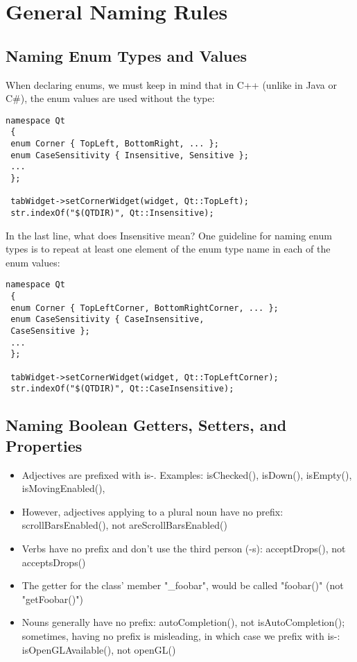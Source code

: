 \documentclass[a4paper,12pt]{article}
\begin{document}
\clearpage
\newpage

\section{General Naming Rules}\label{sec:naming_rules}
\subsection{Naming Enum Types and Values}
When declaring enums, we must keep in mind that in C++ (unlike in Java or C\#), the enum values are used without the type:
\begin{lstlisting}[breaklines]
 namespace Qt
 {
 enum Corner { TopLeft, BottomRight, ... };
 enum CaseSensitivity { Insensitive, Sensitive };
 ...
 };
 
 tabWidget->setCornerWidget(widget, Qt::TopLeft);
 str.indexOf("$(QTDIR)", Qt::Insensitive);
 \end{lstlisting}

In the last line, what does Insensitive mean? One guideline for naming enum types is to repeat at least one element of the enum type name in each of the enum values:
\begin{lstlisting}[breaklines]
 namespace Qt
 {
 enum Corner { TopLeftCorner, BottomRightCorner, ... };
 enum CaseSensitivity { CaseInsensitive,
 CaseSensitive };
 ...
 };
 
 tabWidget->setCornerWidget(widget, Qt::TopLeftCorner);
 str.indexOf("$(QTDIR)", Qt::CaseInsensitive);
 \end{lstlisting}

\subsection{Naming Boolean Getters, Setters, and Properties}
\begin{itemize}
\item Adjectives are prefixed with is-. Examples: isChecked(), isDown(), isEmpty(), isMovingEnabled(), 
\item However, adjectives applying to a plural noun have no prefix: scrollBarsEnabled(), not areScrollBarsEnabled()
\item Verbs have no prefix and don't use the third person (-s): acceptDrops(), not acceptsDrops()
\item The getter for the class' member "\_foobar", would be called "foobar()" (not "getFoobar()")
\item Nouns generally have no prefix:  autoCompletion(), not isAutoCompletion(); sometimes, having no prefix is misleading, in which case we prefix with is-:
isOpenGLAvailable(), not openGL()
\end{itemize}
\end{document}
